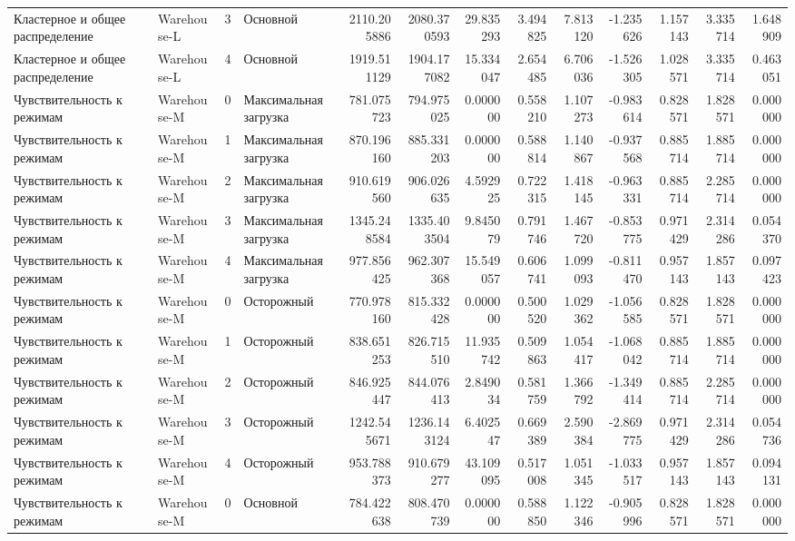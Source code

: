 \begin{tabular}{llrlrrrrrrrrr}
 Кластерное и общее распределение & Warehouse-L & 3 & Основной & 2110.205886 & 2080.370593 & 29.835293 & 3.494825 & 7.813120 & -1.235626 & 1.157143 & 3.335714 & 1.648909 \\
 Кластерное и общее распределение & Warehouse-L & 4 & Основной & 1919.511129 & 1904.177082 & 15.334047 & 2.654485 & 6.706036 & -1.526305 & 1.028571 & 3.335714 & 0.463051 \\
 Чувствительность к режимам & Warehouse-M & 0 & Максимальная загрузка & 781.075723 & 794.975025 & 0.000000 & 0.558210 & 1.107273 & -0.983614 & 0.828571 & 1.828571 & 0.000000 \\
 Чувствительность к режимам & Warehouse-M & 1 & Максимальная загрузка & 870.196160 & 885.331203 & 0.000000 & 0.588814 & 1.140867 & -0.937568 & 0.885714 & 1.885714 & 0.000000 \\
 Чувствительность к режимам & Warehouse-M & 2 & Максимальная загрузка & 910.619560 & 906.026635 & 4.592925 & 0.722315 & 1.418145 & -0.963331 & 0.885714 & 2.285714 & 0.000000 \\
 Чувствительность к режимам & Warehouse-M & 3 & Максимальная загрузка & 1345.248584 & 1335.403504 & 9.845079 & 0.791746 & 1.467720 & -0.853775 & 0.971429 & 2.314286 & 0.054370 \\
 Чувствительность к режимам & Warehouse-M & 4 & Максимальная загрузка & 977.856425 & 962.307368 & 15.549057 & 0.606741 & 1.099093 & -0.811470 & 0.957143 & 1.857143 & 0.097423 \\
 Чувствительность к режимам & Warehouse-M & 0 & Осторожный & 770.978160 & 815.332428 & 0.000000 & 0.500520 & 1.029362 & -1.056585 & 0.828571 & 1.828571 & 0.000000 \\
 Чувствительность к режимам & Warehouse-M & 1 & Осторожный & 838.651253 & 826.715510 & 11.935742 & 0.509863 & 1.054417 & -1.068042 & 0.885714 & 1.885714 & 0.000000 \\
 Чувствительность к режимам & Warehouse-M & 2 & Осторожный & 846.925447 & 844.076413 & 2.849034 & 0.581759 & 1.366792 & -1.349414 & 0.885714 & 2.285714 & 0.000000 \\
 Чувствительность к режимам & Warehouse-M & 3 & Осторожный & 1242.545671 & 1236.143124 & 6.402547 & 0.669389 & 2.590384 & -2.869775 & 0.971429 & 2.314286 & 0.054736 \\
 Чувствительность к режимам & Warehouse-M & 4 & Осторожный & 953.788373 & 910.679277 & 43.109095 & 0.517008 & 1.051345 & -1.033517 & 0.957143 & 1.857143 & 0.094131 \\
 Чувствительность к режимам & Warehouse-M & 0 & Основной & 784.422638 & 808.470739 & 0.000000 & 0.588850 & 1.122346 & -0.905996 & 0.828571 & 1.828571 & 0.000000 \\

\end{tabular}
